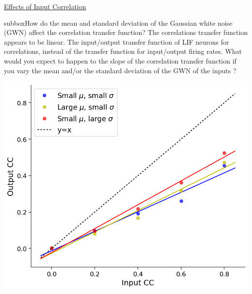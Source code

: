 \begin{textbox}{\href{https://compneuro.neuromatch.io/tutorials/W1D4_GeneralizedLinearModels/student/W1D4_Tutorial1.html}{Effects of Input Correlation } }


\begin{subbox}{subbox}{How do the mean and standard deviation of the Gaussian white noise (GWN) affect the correlation transfer function?}
\scriptsize
The correlations transfer function appears to be linear. The input/output transfer function of LIF neurons for correlations, instead of the transfer function for input/output firing rates.
What would you expect to happen to the slope of the correlation transfer function if you vary the mean and/or the standard deviation of the GWN of the inputs ?
\begin{center}
    
\includegraphics[scale=0.25]{Figures/BNM/LIF_Figure8.png}
\end{center}


\end{subbox}
\end{textbox}
